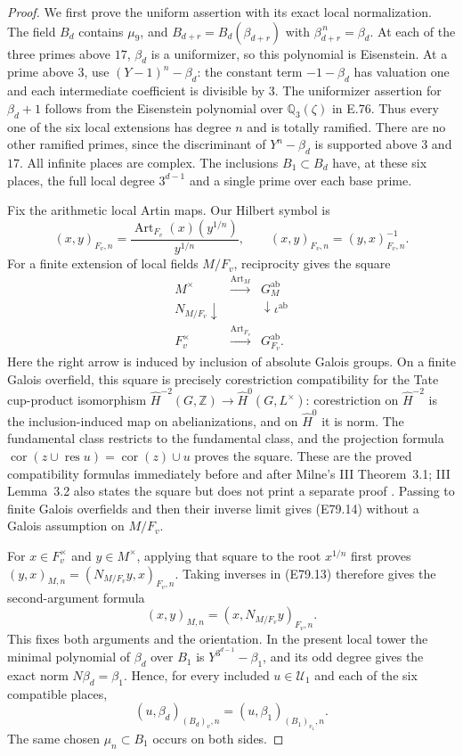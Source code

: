 \begin{proof}
We first prove the uniform assertion with its exact local
normalization. The field $B_d$ contains $\mu_9$, and
$B_{d+r}=B_d(\beta_{d+r})$ with
$\beta_{d+r}^{\,n}=\beta_d$. At each of the three primes above
$17$, $\beta_d$ is a uniformizer, so this polynomial is
Eisenstein. At a prime above $3$, use
$(Y-1)^n-\beta_d$: the constant term $-1-\beta_d$ has valuation
one and each intermediate coefficient is divisible by $3$.
The uniformizer assertion for $\beta_d+1$ follows from the
Eisenstein polynomial over $\mathbb Q_3(\zeta)$ in E.76.
Thus every one of the six local extensions has degree $n$ and
is totally ramified. There are no other ramified primes,
since the discriminant of $Y^n-\beta_d$ is supported above
$3$ and $17$. All infinite places are complex. The inclusions
$B_1\subset B_d$ have, at these six places, the full local
degree $3^{d-1}$ and a single prime over each base prime.

Fix the arithmetic local Artin maps. Our Hilbert symbol is
\[
 (x,y)_{F_v,n}
  =\frac{\operatorname{Art}_{F_v}(x)(y^{1/n})}{y^{1/n}},
 \qquad (x,y)_{F_v,n}=(y,x)_{F_v,n}^{-1}.
 \tag{E79.13}
\]
For a finite extension of local fields $M/F_v$, reciprocity
gives the square
\[
 \begin{array}{ccc}
 M^\times&\xrightarrow{\operatorname{Art}_M}&G_M^{\mathrm{ab}}\\
 N_{M/F_v}\downarrow&&\downarrow\iota^{\mathrm{ab}}\\
 F_v^\times&\xrightarrow{\operatorname{Art}_{F_v}}&G_{F_v}^{\mathrm{ab}}.
 \end{array}
 \tag{E79.14}
\]
Here the right arrow is induced by inclusion of absolute
Galois groups. On a finite Galois overfield, this square
is precisely corestriction compatibility for the Tate
cup-product isomorphism
$\widehat H^{-2}(G,\mathbb Z)\to\widehat H^0(G,L^\times)$:
corestriction on $\widehat H^{-2}$ is the inclusion-induced
map on abelianizations, and on $\widehat H^0$ it is norm.
The fundamental class restricts to the fundamental class,
and the projection formula
$\operatorname{cor}(z\cup\operatorname{res}u)
 =\operatorname{cor}(z)\cup u$ proves the square.
These are the proved compatibility formulas immediately
before and after Milne's III Theorem~3.1; III Lemma~3.2
also states the square but does not print a separate proof
\cite{E_MilneCFT}. Passing to finite Galois overfields and
then their inverse limit gives (E79.14) without a Galois
assumption on $M/F_v$.

For $x\in F_v^\times$ and $y\in M^\times$, applying that
square to the root $x^{1/n}$ first proves
$(y,x)_{M,n}=(N_{M/F_v}y,x)_{F_v,n}$. Taking inverses in
(E79.13) therefore gives the second-argument formula
\[
 (x,y)_{M,n}=(x,N_{M/F_v}y)_{F_v,n}.
 \tag{E79.15}
\]
This fixes both arguments and the orientation. In the present
local tower the minimal polynomial of $\beta_d$ over $B_1$
is $Y^{3^{d-1}}-\beta_1$, and its odd degree gives the exact
norm $N\beta_d=\beta_1$. Hence, for every included
$u\in\mathscr U_1$ and each of the six compatible places,
\[
 (u,\beta_d)_{(B_d)_v,n}
      =(u,\beta_1)_{(B_1)_{v_1},n}.
 \tag{E79.16}
\]
The same chosen $\mu_n\subset B_1$ occurs on both sides.


\end{proof}
